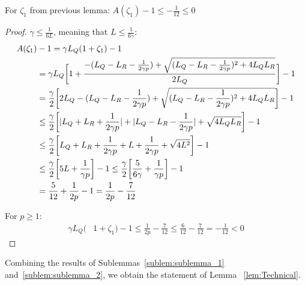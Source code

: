 \begin{sublemma}\label{sublem:sublemma_2}
    For $\zeta_1$ from previous lemma: $A(\zeta_1) - 1 \leq -\frac{1}{12} \leq 0$
\end{sublemma}
\begin{proof}
    $\gamma \leq \frac{1}{6 L}$, meaning that $L \leq \frac{1}{6 \gamma }$:
    \begin{align}
        A(\zeta_1)& - 1 = \gamma L_Q(1+\zeta_1) - 1 \\
        &= \gamma L_Q 
        \biggr[ 1 + \frac{-(L_Q - L_R - \frac{1}{2\gamma p})+\sqrt{(L_Q - L_R -\frac{1}{2\gamma p})^2 + 4 L_Q L_R}}{2L_Q}  \biggr] - 1\\
        &=
        \frac{\gamma}{2} 
        \biggr[ 2L_Q - (L_Q - L_R - \frac{1}{2\gamma p}) + \sqrt{(L_Q - L_R - \frac{1}{2\gamma p})^2 + 4 L_Q L_R}  \biggr] - 1\\ 
        & \leq
        \frac{\gamma}{2} 
        \biggr[ |L_Q + L_R + \frac{1}{2\gamma p}| + |L_Q - L_R - \frac{1}{2\gamma p}| + \sqrt{ 4 L_Q L_R}  \biggr] - 1\\
        & \leq
        \frac{\gamma}{2} 
        \biggr[ L_Q + L_R + \frac{1}{2\gamma p} + L + \frac{1}{2\gamma p} + \sqrt{ 4 L^2}  \biggr] - 1\\
        & \leq
        \frac{\gamma}{2} 
        \biggr[ 5 L + \frac{1}{\gamma p}  \biggr] - 1
        \leq
        \frac{\gamma}{2} 
        \biggr[ \frac{5}{6 \gamma} + \frac{1}{\gamma p}  \biggr] - 1 \\
        &=
        \frac{5}{12} + \frac{1}{2p} - 1
        = \frac{1}{2p} - \frac{7}{12}
    \end{align}
    
    For $p \geq 1$:
    \begin{align}
         \gamma L_Q(&1+\zeta_1) - 1 \leq \frac{1}{2p} - \frac{7}{12} \leq \frac{6}{12} - \frac{7}{12} 
         = -\frac{1}{12} < 0 \label{eq:St_6}
    \end{align}
\end{proof}

Combining the results of Sublemmas~\ref{sublem:sublemma_1} and~\ref{sublem:sublemma_2}, 
we obtain the statement of Lemma ~\ref{lem:Technical}.

